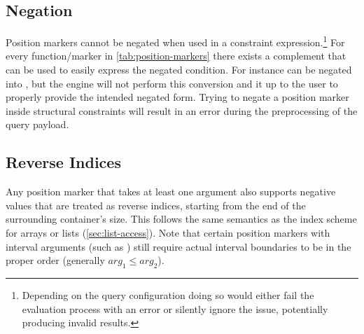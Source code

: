\documentclass[11pt,a4paper]{report}
\begin{document}
\subsection{Negation}
\label{sec:marker-negation}
Position markers cannot be negated when used in a constraint expression.\footnote{Depending on the query configuration doing so would either fail the evaluation process with an error or silently ignore the issue, potentially producing invalid results.}
For every function/marker in \cref{tab:position-markers} there exists a complement that can be used to easily express the negated condition.
For instance  can be negated into , but the engine will not perform this conversion and it up to the user to properly provide the intended negated form.
Trying to negate a position marker inside structural constraints will result in an error during the preprocessing of the query payload.

\subsection{Reverse Indices}
\label{sec:marker-reverse}
Any position marker that takes at least one argument also supports negative values that are treated as reverse indices, starting from the end of the surrounding container's size.
This follows the same semantics as the index scheme for arrays or lists (\ref{sec:list-access}).
Note that certain position markers with interval arguments (such as ) still require actual interval boundaries to be in the proper order (generally $arg_1 \leq arg_2$).
\end{document}
